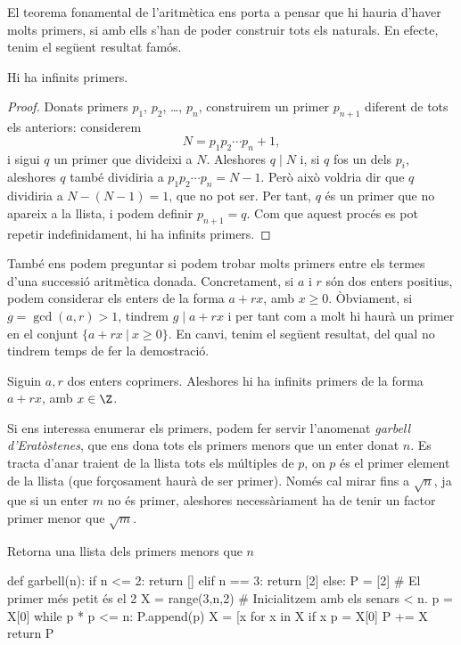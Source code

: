 El teorema fonamental de l'aritmètica ens porta a pensar que hi hauria d'haver molts primers, si amb ells s'han de poder construir tots els naturals. En efecte, tenim el següent resultat famós.

\begin{theorem}[Euclides]
 Hi ha infinits primers.
\end{theorem}
\begin{proof}
 Donats primers $p_1$, $p_2$, \ldots, $p_n$, construirem un primer $p_{n+1}$ diferent de tots els anteriors: considerem
 \[
 N= p_1 p_2\cdots p_n +1,
 \]
 i sigui $q$ un primer que divideixi a $N$. Aleshores $q\mid N$ i, si $q$ fos un dels $p_i$, aleshores $q$ també dividiria a $p_1p_2\cdots p_n = N-1$. Però això voldria dir que $q$ dividiria a $N-(N-1)=1$, que no pot ser. Per tant, $q$ és un primer que no apareix a la llista, i podem definir $p_{n+1} = q$. Com que aquest procés es pot repetir indefinidament, hi ha  infinits primers.
\end{proof}

També ens podem preguntar si podem trobar molts primers entre els termes d'una successió aritmètica donada. Concretament, si $a$ i $r$ són dos enters positius, podem considerar els enters de la forma $a + rx$, amb $x\geq 0$. Òbviament, si $g=\gcd(a,r)>1$, tindrem $g\mid a+rx$ i per tant com a molt hi haurà un primer en el conjunt $\{a+rx ~|~ x\geq 0\}$. En canvi, tenim el següent resultat, del qual no tindrem temps de fer la demostració.
\begin{theorem}[Dirichlet]
Siguin $a,r$ dos enters coprimers. Aleshores hi ha infinits primers de la forma $a+rx$, amb $x\in\Z$.
\end{theorem}


Si ens interessa enumerar els primers, podem fer servir l'anomenat \emph{garbell d'Eratòstenes}, que ens dona tots els primers menors que un enter donat $n$. Es tracta d'anar traient de la llista tots els múltiples de $p$, on $p$ és el primer element de la llista (que forçosament haurà de ser primer). Només cal mirar fins a $\sqrt{n}$, ja que si un enter $m$ no és primer, aleshores necessàriament ha de tenir un factor primer menor que $\sqrt{m}$.

\begin{algo}
\caption{Retorna una llista dels primers menors que $n$}
\begin{python}
def garbell(n):
    if n <= 2:
        return []
    elif n == 3:
        return [2]
    else:
        P = [2] # El primer més petit és el 2
        X = range(3,n,2) # Inicialitzem amb els senars < n.
        p = X[0]
        while p * p <= n:
            P.append(p)
            X = [x for x in X if x %
            p = X[0]
        P += X
        return P
\end{python}
\end{algo}

